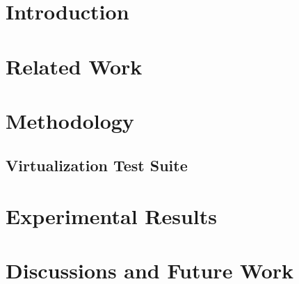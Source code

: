 \documentclass[12pt,onecolumn,oneside]{article}
\begin{document}

\newpage

\onecolumn

\setcounter{page}{1}
\section{Introduction}

\newpage

% 


\section{Related Work}


\newpage

\section{Methodology}

\subsection{Virtualization Test Suite}

\newpage


\section{Experimental Results}

\newpage

\section{Discussions and Future Work}

\newpage


\end{document}
